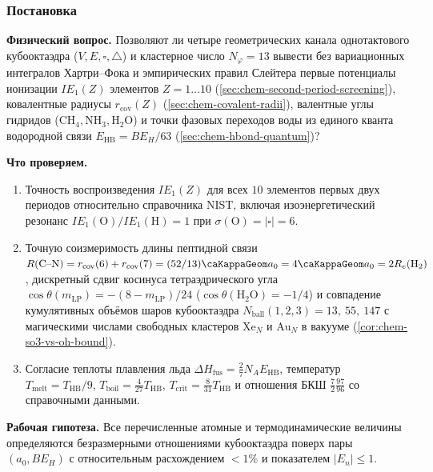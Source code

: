 \label{exp:cech01}

\subsubsection*{Постановка}
\textbf{Физический вопрос.}
Позволяют ли четыре геометрических канала однотактового кубооктаэдра ($V, E, \square, \triangle$) и кластерное число $N_\varphi = 13$ вывести без вариационных интегралов Хартри--Фока и эмпирических правил Слейтера первые потенциалы ионизации $IE_1(Z)$ элементов $Z=1\ldots 10$ (\cref{sec:chem-second-period-screening}), ковалентные радиусы $r_{\mathrm{cov}}(Z)$ (\cref{sec:chem-covalent-radii}), валентные углы гидридов ($\text{CH}_4, \text{NH}_3, \text{H}_2\text{O}$) и точки фазовых переходов воды из единого кванта водородной связи $E_{\mathrm{HB}} = BE_H/63$ (\cref{sec:chem-hbond-quantum})?

\textbf{Что проверяем.}
\begin{enumerate}[label=\textbf{(\alph*)},leftmargin=*,itemsep=0.25em]
\item Точность воспроизведения $IE_1(Z)$ для всех $10$ элементов первых двух периодов относительно справочника NIST, включая изоэнергетический резонанс $IE_1(\text{O})/IE_1(\text{H}) = 1$ при $\sigma(\text{O}) = |\square| = 6$.
\item Точную соизмеримость длины пептидной связи $R(\text{C--N}) = r_{\mathrm{cov}}(6)+r_{\mathrm{cov}}(7) = (52/13)\caKappaGeom a_0 = 4\caKappaGeom a_0 = 2R_e(\text{H}_2)$, дискретный сдвиг косинуса тетраэдрического угла $\cos\theta(m_{\mathrm{LP}}) = -(8-m_{\mathrm{LP}})/24$ ($\cos\theta(\text{H}_2\text{O}) = -1/4$) и совпадение кумулятивных объёмов шаров кубооктаэдра $N_{\mathrm{ball}}(1,2,3) = 13,\ 55,\ 147$ с магическими числами свободных кластеров $\text{Xe}_N$ и $\text{Au}_N$ в вакууме (\cref{cor:chem-so3-vs-oh-bound}).
\item Согласие теплоты плавления льда $\Delta H_{\mathrm{fus}} = \frac{2}{7}N_A E_{\mathrm{HB}}$, температур $T_{\mathrm{melt}} = T_{\mathrm{HB}}/9$, $T_{\mathrm{boil}} = \frac{4}{27}T_{\mathrm{HB}}$, $T_{\mathrm{crit}} = \frac{8}{31}T_{\mathrm{HB}}$ и отношения БКШ $\frac{7}{2}\frac{97}{96}$ со справочными данными.
\end{enumerate}

\textbf{Рабочая гипотеза.}
Все перечисленные атомные и термодинамические величины определяются безразмерными отношениями кубооктаэдра поверх пары $(a_0, BE_H)$ с относительным расхождением $<1\%$ и показателем $|E_n| \le 1$.

